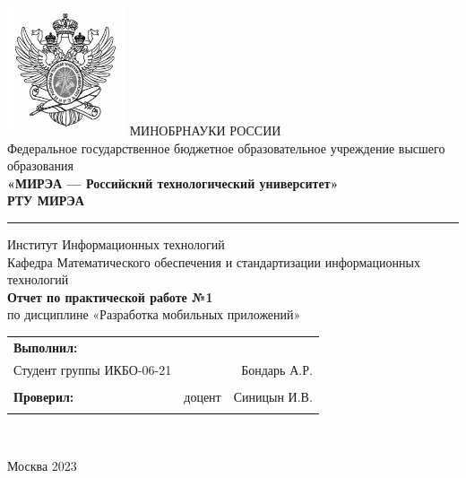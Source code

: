 \begin{center}
	\includegraphics[scale=0.5]{logo.png} \break %
	\normalsize{МИНОБРНАУКИ РОССИИ}\\
	\normalsize{Федеральное государственное бюджетное образовательное учреждение высшего образования}\\
	\normalsize{\textbf{«МИРЭА --- Российский технологический университет»}}\\
	\large{\textbf{РТУ МИРЭА}}\\
	\bigskip \hrule \smallskip
	\normalsize{Институт Информационных технологий}\\
	 \hfill \break
	\normalsize{Кафедра Математического обеспечения и стандартизации информационных технологий}\\
	\hfill \break
	\hfill \break
	\hfill \break
	\large{\textbf{Отчет по практической работе №1}}\\
	\normalsize{по дисциплине «Разработка мобильных приложений»}\\
	\hfill \break
	\hfill \break
	\hfill \break
	\normalsize{
		\begin{tabular}{lrr}
			\textbf{Выполнил:} & &\\
			Студент группы ИКБО-06-21 & & Бондарь А.Р. \\\\
			\textbf{Проверил:} &  доцент & Синицын И.В. \\\\
		\end{tabular}
	}\\
	\hfill \break
\end{center}

\begin{center} Москва 2023 \end{center}

\thispagestyle{empty}
